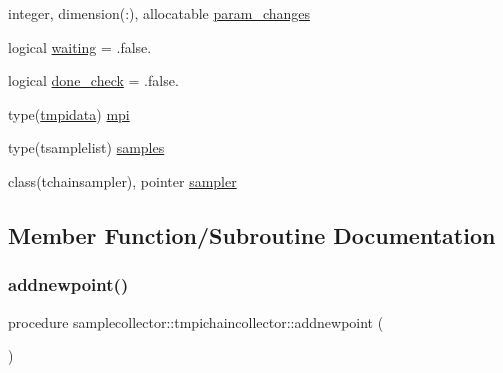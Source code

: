 \begin{DoxyCompactItemize}
\item 
integer, dimension(\+:), allocatable \mbox{\hyperlink{structsamplecollector_1_1tmpichaincollector_ae95fcb36e2c43ed5aedd8a5a3fc58cf8}{param\+\_\+changes}}
\item 
logical \mbox{\hyperlink{structsamplecollector_1_1tmpichaincollector_a2e988206321500182b98413a4c8a7de5}{waiting}} = .false.
\item 
logical \mbox{\hyperlink{structsamplecollector_1_1tmpichaincollector_a99d7561eeb3a3b06da25205f13742be4}{done\+\_\+check}} = .false.
\item 
type(\mbox{\hyperlink{structsamplecollector_1_1tmpidata}{tmpidata}}) \mbox{\hyperlink{structsamplecollector_1_1tmpichaincollector_a0beccac8406a4ce9ee452ab2ac794309}{mpi}}
\item 
type(tsamplelist) \mbox{\hyperlink{structsamplecollector_1_1tmpichaincollector_a3f699453270696379254decdeb714ff4}{samples}}
\item 
class(tchainsampler), pointer \mbox{\hyperlink{structsamplecollector_1_1tmpichaincollector_ad7759c82affb0f6d062a394b42409e5d}{sampler}}
\end{DoxyCompactItemize}


\subsection{Member Function/\+Subroutine Documentation}
\mbox{\label{structsamplecollector_1_1tmpichaincollector_a43c4fe2ce78e7de2be290a07654f4303}} 
\subsubsection{\texorpdfstring{addnewpoint()}{addnewpoint()}}
{\footnotesize\ttfamily procedure samplecollector\+::tmpichaincollector\+::addnewpoint (\begin{DoxyParamCaption}{ }\end{DoxyParamCaption})\hspace{0.3cm}{\ttfamily [private]}}

\mbox{\label{structsamplecollector_1_1tmpichaincollector_a98d7b311e1e178a7690e71afc27316ac}} 
